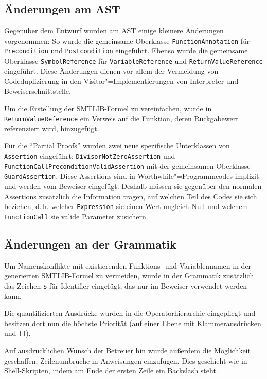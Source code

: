 \subsection{Änderungen am AST}

Gegenüber dem Entwurf wurden am AST einige kleinere Änderungen vorgenommen: So wurde die gemeinsame Oberklasse \texttt{FunctionAnnotation} für \texttt{Precondition} und \texttt{Postcondition} eingeführt. Ebenso wurde die gemeinsame Oberklasse \texttt{SymbolReference} für \texttt{VariableReference}  und \texttt{ReturnValueReference} eingeführt. Diese Änderungen dienen vor allem der Vermeidung von Codeduplizierung in den Visitor"=Implementierungen von Interpreter und Beweiserschnittstelle.

Um die Erstellung der SMTLIB-Formel zu vereinfachen, wurde in \texttt{ReturnValueReference} ein Verweis auf die Funktion, deren Rückgabewert referenziert wird, hinzugefügt.

Für die "`Partial Proofs"' wurden zwei neue spezifische Unterklassen von \texttt{Assertion} eingeführt: \texttt{DivisorNotZeroAssertion} und \texttt{FunctionCallPreconditionValidAssertion} mit der gemeinsamen Oberklasse \texttt{GuardAssertion}. Diese Assertions sind in Worthwhile"=Programmcodes implizit und werden vom Beweiser eingefügt. Deshalb müssen sie gegenüber den normalen Assertions zusätzlich die Information tragen, auf welchen Teil des Codes sie sich beziehen, d.\,h. welcher \texttt{Expression} sie einen Wert ungleich Null und welchem \texttt{FunctionCall} sie valide Parameter zusichern.

\subsection{Änderungen an der Grammatik}

Um Namenskonflikte mit existierenden Funktions- und Variablennamen in der generierten SMTLIB-Formel zu vermeiden, wurde in der Grammatik zusätzlich das Zeichen \texttt{\$} für Identifier eingefügt, das nur im Beweiser verwendet werden kann.

Die quantifizierten Ausdrücke wurden in die Operatorhierarchie eingepflegt und besitzen dort nun die höchste Priorität (auf einer Ebene mit Klammerausdrücken und \texttt{[]}).

Auf ausdrücklichen Wunsch der Betreuer hin wurde außerdem die Möglichkeit geschaffen, Zeilenumbrüche in Anweisungen einzufügen. Dies geschieht wie in Shell-Skripten, indem am Ende der ersten Zeile ein Backslash steht.
